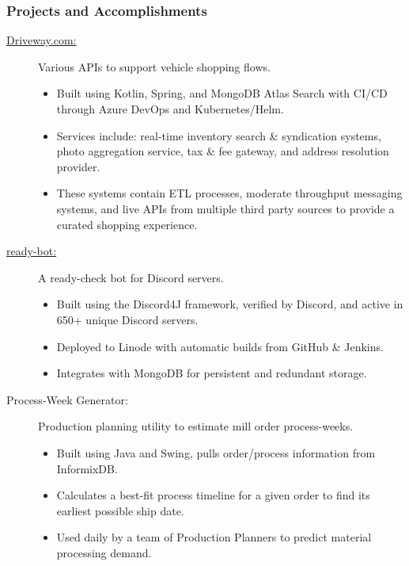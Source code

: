 \documentclass{article}
\begin{document}
\subsubsection*{Projects and Accomplishments}
    \begin{description}

        \item[\href{https://driveway.com/shop}{Driveway.com:\hspace{0.075in}}] Various APIs to support vehicle shopping flows.
            \begin{itemize}
                \item Built using Kotlin, Spring, and MongoDB Atlas Search with CI/CD through Azure DevOps and Kubernetes/Helm.
                \item Services include: real-time inventory search \& syndication systems, photo aggregation service, tax \& fee gateway, and address resolution provider.
                \item These systems contain ETL processes, moderate throughput messaging systems, and live APIs from multiple third party sources to provide a curated shopping experience.
            \end{itemize}

            \vspace{0.5em}
        \item[\href{https://www.github.com/BurnsCommaLucas/ready-botlin}{ready-bot:\hspace{0.075in}}] A ready-check bot for Discord servers.
            \begin{itemize}
                \item Built using the Discord4J framework, verified by Discord, and active in 650+ unique Discord servers.
                \item Deployed to Linode with automatic builds from GitHub \& Jenkins.
                \item Integrates with MongoDB for persistent and redundant storage.
            \end{itemize}

            \vspace{0.5em}

        \item[Process-Week Generator:] Production planning utility to estimate mill order process-weeks.
            \begin{itemize}
                \item Built using Java and Swing, pulls order/process information from InformixDB.
                \item Calculates a best-fit process timeline for a given order to find its earliest possible ship date.
                \item Used daily by a team of Production Planners to predict material processing demand.
            \end{itemize}


\end{description}
\end{document}
